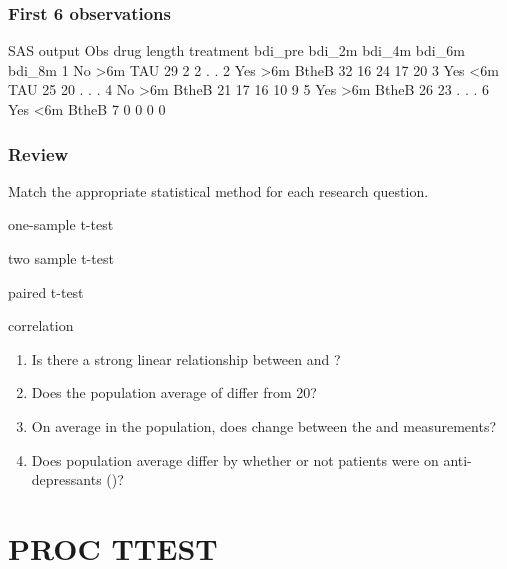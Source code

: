 \begin{frame}[fragile]
\frametitle{First 6 observations}
\footnotesize
\begin{craw}{.0}{SAS output}
Obs  drug length treatment bdi\_pre  bdi\_2m bdi\_4m bdi\_6m  bdi\_8m
  1    No    >6m       TAU      29      2      2      .      .
  2   Yes    >6m     BtheB      32     16     24     17     20
  3   Yes    <6m       TAU      25     20      .      .      .
  4    No    >6m     BtheB      21     17     16     10      9
  5   Yes    >6m     BtheB      26     23      .      .      .
  6   Yes    <6m     BtheB       7      0      0      0      0
\end{craw}
\emp
\end{frame}

\begin{frame}
\frametitle{Review}
\oyo Match the appropriate statistical method for each research question.
\vskip10pt
\be
\item one-sample t-test
\item two sample t-test
\item paired t-test
\item correlation
\ee
\emp
{} \hspace{0.05in} \emp
{}
\begin{enumerate}[]
\item[\underline{\hspace{0.25in}}] Is there a strong linear relationship between  and ?
\item[\underline{\hspace{0.25in}}] Does the population average of  differ from 20?
\item[\underline{\hspace{0.25in}}] On average in the population, does  change between the  and  measurements?
\item[\underline{\hspace{0.25in}}] Does population average  differ by whether or not patients were on anti-depressants ()?
\end{enumerate}
\emp
\end{frame}

\section[PROC TTEST]{PROC TTEST}
